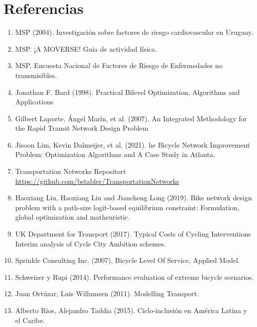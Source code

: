 \documentclass{article}
\begin{document}
  \section*{Referencias}

  \begin{enumerate}
      \item{\label{heartrisksuy} MSP (2004). Investigación sobre factores de riesgo cardiovascular en Uruguay.}
    \item{\label{mspphisicalactivityguid} MSP. ¡A MOVERSE! Guia de actividad física.}
    \item{\label{mspsurveyriskfactors} MSP. Encuesta Nacional de Factores de Riesgo de Enfermedades no transmisibles.}
    \item{\label{bardbook} Jonathan F. Bard (1998). Practical Bilevel Optimization, Algorithms and Applications}
    \item{\label{laporte2007} Gilbert Laporte, Ángel Marín, et al. (2007). An Integrated Methodology for the Rapid Transit Network Design Problem}
    \item{\label{lim2021}} Jisoon Lim, Kevin Dalmeijer, et al. (2021). he Bicycle Network Improvement Problem: Optimization Algorithms and A Case Study in Atlanta.
    \item{\label{transportationnetworkrepo} Transportation Networks Repositort \url{https://github.com/bstabler/TransportationNetworks}}
    \item{\label{liu2019} Haoxiang Liu, Haoxiang Liu and Jiancheng Long (2019). Bike network design problem with a path-size logit-based equilibrium constraint: Formulation, global optimization and matheuristic.}
    \item{\label{typicalcostsofcylcing} UK Department for Transport (2017). Typical Costs of Cycling Interventions Interim analysis of Cycle City Ambition schemes.}
    \item{\label{blos2007} Sprinkle Consulting Inc. (2007), Bicycle Level Of Service, Applied Model.}
    \item{\label{shwe2014} Schweizer y Rupi (2014). Performance evaluation of extreme bicycle scenarios.}
    \item{\label{ortuz2011} Juan Ortúzar, Luis Willumsen (2011). Modelling Transport.}
    \item{\label{rios2015} Alberto Ríos, Alejandro Taddia (2015). Ciclo-inclusión en América Latina y el Caribe.}
  \end{enumerate}
\end{document}
